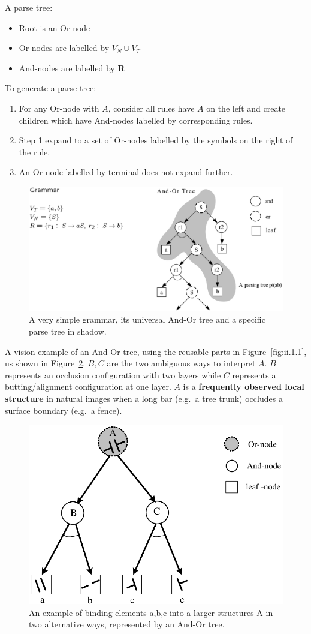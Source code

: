 \documentclass[10pt,oneside]{book}
\newcommand{\Fig}[1]{Figure~\ref{fig:#1}}
\begin{document}
A parse tree:
%
\begin{itemize}
  \item Root is an Or-node
  \item Or-nodes are labelled by $V_N \cup V_T$
  \item And-nodes are labelled by $\mathbf{R}$
\end{itemize}
%
To generate a parse tree:
%
\begin{enumerate}
  \item For any Or-node with $A$, consider all rules have $A$ on the left and
    create children which have And-nodes labelled by corresponding rules.
  \item Step 1 expand to a set of Or-nodes labelled by the symbols on the right
    of the rule.
  \item An Or-node labelled by terminal does not expand further.
\end{enumerate}
%
\begin{figure}[!htpb]
  \centering
  \includegraphics[width=0.7\linewidth]{./fig/fig_ii_1_2.png}
  \caption{A very simple grammar, its universal And-Or tree and a specific
    parse tree in shadow.}%
  \label{fig:ii.1.2}
\end{figure}
%

A vision example of an And-Or tree, using the reusable parts in
\Fig{ii.1.1}, us shown in \Fig{ii.1.3}. $B, C$ are the two ambiguous ways to
interpret $A$. $B$ represents an occlusion configuration with two layers while
$C$ represents a butting/alignment configuration at one layer.  $A$ is a
\textbf{frequently observed local structure} in natural images when a long bar
(e.g.\ a tree trunk) occludes a surface boundary (e.g.\ a fence).
%
\begin{figure}[!htpb]
  \centering
  \includegraphics[width=0.4\linewidth]{./fig/fig_ii_1_3.png}
  \caption{An example of binding elements a,b,c into a larger structures A in
    two alternative ways, represented by an And-Or tree.}%
  \label{fig:ii.1.3}
\end{figure}
%
\end{document}
